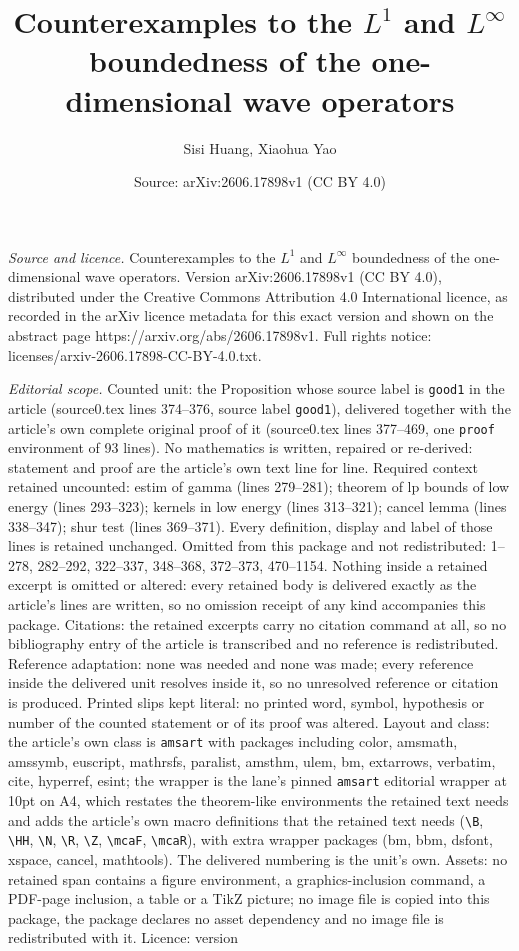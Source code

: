 \documentclass[10pt,a4paper]{amsart}
\title[Counterexamples to the $L^1$ and $L^{\infty}$ boundedness of]{Counterexamples to the $L^1$ and $L^{\infty}$ boundedness of the one-dimensional wave operators}
\author{Sisi Huang, Xiaohua Yao}
\date{Source: arXiv:2606.17898v1 (CC BY 4.0)}
\begin{document}
\maketitle

\noindent\emph{Source and licence.} Counterexamples to the $L^1$ and $L^{\infty}$ boundedness of the one-dimensional wave operators. Version arXiv:2606.17898v1 (CC BY 4.0), distributed under the Creative Commons Attribution 4.0 International licence, as recorded in the arXiv licence metadata for this exact version and shown on the abstract page https://arxiv.org/abs/2606.17898v1. Full rights notice: licenses/arxiv-2606.17898-CC-BY-4.0.txt.\par\smallskip

\noindent\textit{Editorial scope.} Counted unit: the Proposition whose source label is \texttt{good1} in the article (source0.tex lines 374--376, source label \texttt{good1}), delivered together with the article's own complete original proof of it (source0.tex lines 377--469, one \texttt{proof} environment of 93 lines). No mathematics is written, repaired or re-derived: statement and proof are the article's own text line for line. Required context retained uncounted: estim of gamma (lines 279--281); theorem of lp bounds of low energy (lines 293--323); kernels in low energy (lines 313--321); cancel lemma (lines 338--347); shur test (lines 369--371). Every definition, display and label of those lines is retained unchanged. Omitted from this package and not redistributed: 1--278, 282--292, 322--337, 348--368, 372--373, 470--1154. Nothing inside a retained excerpt is omitted or altered: every retained body is delivered exactly as the article's lines are written, so no omission receipt of any kind accompanies this package. Citations: the retained excerpts carry no citation command at all, so no bibliography entry of the article is transcribed and no reference is redistributed. Reference adaptation: none was needed and none was made; every reference inside the delivered unit resolves inside it, so no unresolved reference or citation is produced. Printed slips kept literal: no printed word, symbol, hypothesis or number of the counted statement or of its proof was altered. Layout and class: the article's own class is \texttt{amsart} with packages including color, amsmath, amssymb, euscript, mathrsfs, paralist, amsthm, ulem, bm, extarrows, verbatim, cite, hyperref, esint; the wrapper is the lane's pinned \texttt{amsart} editorial wrapper at 10pt on A4, which restates the theorem-like environments the retained text needs and adds the article's own macro definitions that the retained text needs (\texttt{\textbackslash B}, \texttt{\textbackslash HH}, \texttt{\textbackslash N}, \texttt{\textbackslash R}, \texttt{\textbackslash Z}, \texttt{\textbackslash mcaF}, \texttt{\textbackslash mcaR}), with extra wrapper packages (bm, bbm, dsfont, xspace, cancel, mathtools). The delivered numbering is the unit's own. Assets: no retained span contains a figure environment, a graphics-inclusion command, a PDF-page inclusion, a table or a TikZ picture; no image file is copied into this package, the package declares no asset dependency and no image file is redistributed with it. Licence: version 
\end{document}
